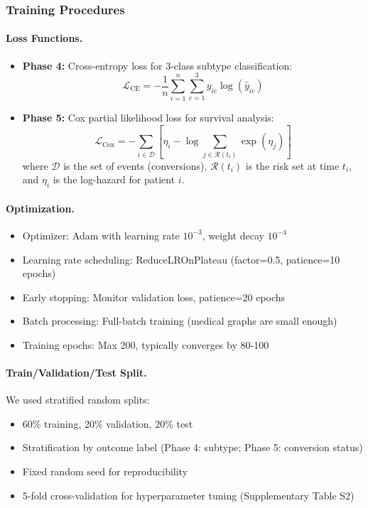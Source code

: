 \subsubsection{Training Procedures}

\paragraph{Loss Functions.}
\begin{itemize}
    \item \textbf{Phase 4:} Cross-entropy loss for 3-class subtype classification:
    \begin{equation}
        \mathcal{L}_{\text{CE}} = -\frac{1}{n} \sum_{i=1}^n \sum_{c=1}^3 y_{ic} \log(\hat{y}_{ic})
    \end{equation}
    
    \item \textbf{Phase 5:} Cox partial likelihood loss for survival analysis:
    \begin{equation}
        \mathcal{L}_{\text{Cox}} = -\sum_{i \in \mathcal{D}} \left[ \eta_i - \log \sum_{j \in \mathcal{R}(t_i)} \exp(\eta_j) \right]
    \end{equation}
    where $\mathcal{D}$ is the set of events (conversions), $\mathcal{R}(t_i)$ is the risk set at time $t_i$, and $\eta_i$ is the log-hazard for patient $i$.
\end{itemize}

\paragraph{Optimization.}
\begin{itemize}
    \item Optimizer: Adam\cite{kingma2014adam} with learning rate $10^{-3}$, weight decay $10^{-4}$
    \item Learning rate scheduling: ReduceLROnPlateau (factor=0.5, patience=10 epochs)
    \item Early stopping: Monitor validation loss, patience=20 epochs
    \item Batch processing: Full-batch training (medical graphs are small enough)
    \item Training epochs: Max 200, typically converges by 80-100
\end{itemize}

\paragraph{Train/Validation/Test Split.}
We used stratified random splits:
\begin{itemize}
    \item 60\% training, 20\% validation, 20\% test
    \item Stratification by outcome label (Phase 4: subtype; Phase 5: conversion status)
    \item Fixed random seed for reproducibility
    \item 5-fold cross-validation for hyperparameter tuning (Supplementary Table S2)
\end{itemize}

